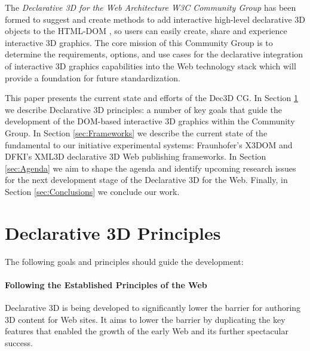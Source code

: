 \documentclass[review]{acmsiggraph}
\begin{document}
The \textit{Declarative 3D for the Web Architecture W3C Community Group} \cite{Dec3D-CG} has been formed to suggest and create methods to add interactive high-level declarative 3D objects to the HTML-DOM \cite{W3C-DOM}, so users can easily create, share and experience interactive 3D graphics. The core mission of this Community Group is to determine the requirements, options, and use cases for the declarative integration of interactive 3D graphics capabilities into the Web technology stack which will provide a foundation for future standardization.

This paper presents the current state and efforts of the Dec3D CG. In Section \ref{sec:Principles} we describe Declarative 3D principles: a number of key goals that guide the development of the DOM-based interactive 3D graphics within the Community Group.
In Section \ref{sec:Frameworks} we describe the current state of the fundamental to our initiative experimental systems: Fraunhofer's X3DOM \cite{Behr2009} and DFKI's XML3D \cite{Sons2010} declarative 3D Web publishing frameworks.
In Section \ref{sec:Agenda} we aim to shape the agenda and identify upcoming research issues for the next development stage of the Declarative 3D for the Web. Finally, in Section \ref{sec:Conclusions} we conclude our work.

\section{Declarative 3D Principles}
\label{sec:Principles}
The following goals and principles should guide the development:

\paragraph{Following the Established Principles of the Web}
Declarative 3D is being developed to significantly lower the barrier for authoring 3D content for Web sites. It aims to lower the barrier by duplicating the key features that enabled the growth of the early Web and its further spectacular success.
\end{document}
